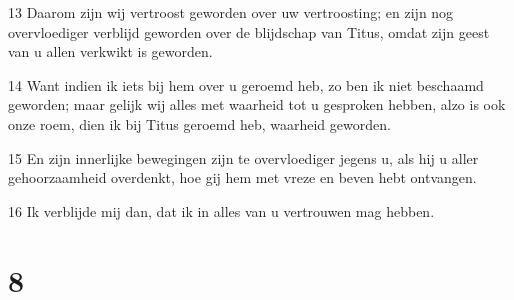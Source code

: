 \par 13 Daarom zijn wij vertroost geworden over uw vertroosting; en zijn nog overvloediger verblijd geworden over de blijdschap van Titus, omdat zijn geest van u allen verkwikt is geworden.
\par 14 Want indien ik iets bij hem over u geroemd heb, zo ben ik niet beschaamd geworden; maar gelijk wij alles met waarheid tot u gesproken hebben, alzo is ook onze roem, dien ik bij Titus geroemd heb, waarheid geworden.
\par 15 En zijn innerlijke bewegingen zijn te overvloediger jegens u, als hij u aller gehoorzaamheid overdenkt, hoe gij hem met vreze en beven hebt ontvangen.
\par 16 Ik verblijde mij dan, dat ik in alles van u vertrouwen mag hebben.

\chapter{8}

